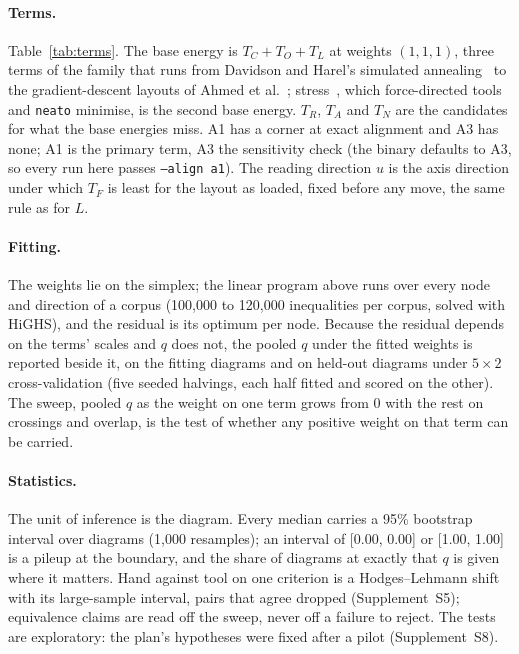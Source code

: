 \documentclass[11pt]{article}
\begin{document}
\paragraph{Terms.} Table~\ref{tab:terms}. The base energy is $T_C + T_O + T_L$ at weights
$(1,1,1)$, three terms of the family that runs from Davidson and Harel's simulated
annealing~\cite{dh96} to the gradient-descent layouts of Ahmed et al.\ \cite{ahmed20};
stress~\cite{kamada89, gansner05}, which force-directed tools and \texttt{neato}
minimise, is the second base energy. $T_R$, $T_A$ and $T_N$ are the candidates for what
the base energies miss. A1 has a corner at exact alignment and A3 has none; A1 is the primary
term, A3 the sensitivity check (the binary defaults to A3, so every run here passes
\texttt{--align a1}). The reading direction $u$ is the axis direction
under which $T_F$ is least for the layout as loaded, fixed before any move, the same rule
as for $L$.

\paragraph{Fitting.} The weights lie on the simplex; the linear program above runs over
every node and direction of a corpus (100,000 to 120,000 inequalities per corpus, solved
with HiGHS), and the residual is its optimum per node. Because the residual depends on the
terms' scales and $q$ does not, the pooled $q$ under the fitted weights is reported beside
it, on the fitting diagrams and on held-out diagrams under $5 \times 2$ cross-validation
(five seeded halvings, each half fitted and scored on the other). The sweep, pooled $q$ as the weight on one term grows from 0 with
the rest on crossings and overlap, is the test of whether any positive weight on that
term can be carried.

\paragraph{Statistics.} The unit of inference is the diagram. Every median carries a 95\%
bootstrap interval over diagrams (1,000 resamples); an interval of [0.00, 0.00] or [1.00,
1.00] is a pileup at the boundary, and the share of diagrams at exactly that $q$ is given
where it matters. Hand against tool on one criterion is a Hodges--Lehmann shift with its
large-sample interval, pairs that agree dropped (Supplement~S5);
equivalence claims are read off the sweep, never off a failure to reject. The tests are
exploratory: the plan's hypotheses were fixed after a pilot (Supplement~S8).
\end{document}
